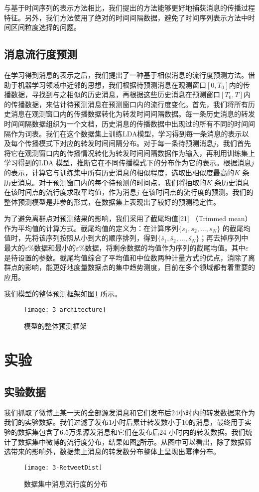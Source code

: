 与基于时间序列的表示方法相比，我们提出的方法能够更好地捕获消息的传播过程特征。另外，我们方法使用了绝对的时间间隔数据，避免了时间序列表示方法中时间区间粒度选择的问题。

\subsection{消息流行度预测}
在学习得到消息的表示之后，我们提出了一种基于相似消息的流行度预测方法。借助于机器学习领域中近邻的思想，我们根据待预测消息在观测窗口$[0,T_0]$内的传播数据，寻找到与之相似的历史消息，再根据这些历史消息在预测窗口$[T_0,T]$内的传播数据，来估计待预测消息在预测窗口内的流行度变化。首先，我们将所有历史消息在观测窗口内的传播数据转化为转发时间间隔数据。每一条历史消息的转发时间间隔数据组织为一个文档，历史消息的传播数据中出现过的所有不同的时间间隔作为词表。我们在这个数据集上训练LDA模型，学习得到每一条消息的表示以及每个传播模式下对应的转发时间间隔分布。对于每一条待预测消息$j$，我们首先将它在观测窗口内的传播情况转化为转发时间间隔数据作为输入，再利用训练集上学习得到的LDA 模型，推断它在不同传播模式下的分布作为它的表示。根据消息$j$的表示，计算它与训练集中所有历史消息的相似程度，选取出相似度最高的$K$ 条历史消息。对于预测窗口内的每个待预测的时间点，我们将抽取的$K$ 条历史消息在该时间点的流行度求取平均值，作为消息$j$ 在该时间点的流行度的预测。我们的整体预测模型是非参的形式，在数据集上表现出了较好的预测稳定性。

为了避免离群点对预测结果的影响，我们采用了截尾均值[21] （Trimmed mean）作为平均值的计算方式。截尾均值的定义为：在计算序列$\{s_1,s_2,...,s_N\}$ 的截尾均值时，先将该序列按照从小到大的顺序排列，得到$\{\widetilde{s_1},\widetilde{s_2},...,\widetilde{s_N}\}$；再去掉序列中最大的$\varepsilon$\%数据和最小的$\varepsilon$\%数据，将剩余数据的均值作为序列的截尾均值。其中$\varepsilon$是待设置的参数。截尾均值综合了平均值和中位数两种计量方式的优点，消除了离群点的影响，能更好地度量数据点的集中趋势测度，目前在多个领域都有着重要的应用。

我们模型的整体预测框架如图\ref{fig:architecture} 所示。
\begin{figure}[!htb]
  \centering
  \texttt{[image: 3-architecture]}
  \caption{模型的整体预测框架}
  \label{fig:architecture}
\end{figure}

\section{实验}
\subsection{实验数据}
我们抓取了微博上某一天的全部源发消息和它们发布后24小时内的转发数据来作为我们的实验数据。我们过滤了发布1小时后累计转发数小于10的消息，最终用于实验的数据集包含了6.5万条源发消息和它们在发布后24 小时内的转发数据。我们统计了数据集中微博的流行度分布，结果如图\ref{fig:retweetDist}所示。从图中可以看出，除了数据筛选带来的影响外，数据集上消息的转发数分布整体上呈现出幂律分布。
\begin{figure}[!htbp]
  \centering
  \texttt{[image: 3-RetweetDist]}
  \caption{数据集中消息流行度的分布}
  \label{fig:retweetDist}
\end{figure}

